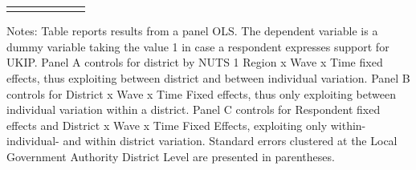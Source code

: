 \documentclass[[a4paper,11pt]{article}
\begin{document}
\begin{landscape}
\begin{table}[tbp]
{\begin{threeparttable}
\begin{tabular}{l*{6}{c}}
\addlinespace

\bottomrule
\end{tabular}
    \begin{tablenotes} {\footnotesize
\item Notes: Table reports results from a panel OLS. The dependent variable is a dummy variable taking the value 1 in case a respondent expresses support for UKIP. Panel A controls for district by NUTS 1 Region x Wave x Time fixed effects, thus exploiting between district and between individual variation. Panel B controls for District x Wave x Time Fixed effects, thus only exploiting between individual variation within a district. Panel C controls for Respondent fixed effects and District x Wave x Time Fixed Effects, exploiting only within-individual- and within district variation.   Standard errors clustered at the Local Government Authority District Level are presented in parentheses.} \end{tablenotes}
      \end{threeparttable}
      
 }
      
\end{table}
\end{landscape}
\end{document}
